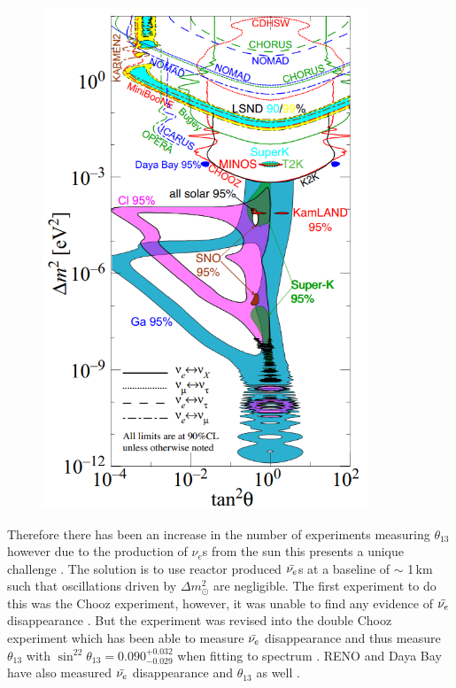 \begin{figure}[htbp]
 \centering
 \includegraphics[height=150mm]{Chapter1/Figs/Raster/neutrino_angles_experiments_variations.png} %
 \label{neutrino_angles_experiments_variations}
\end{figure}
Therefore there has been an increase in the number of experiments measuring $\theta_{13}$ however due to the production of $\nu_e$s from the sun this presents a unique challenge \cite{Olive_2014}. The solution is to use reactor produced $\Bar{\nu_e}$s at a baseline of $\sim$ 1\,km such that oscillations driven by $\Delta m_\odot^2$ are negligible. The first experiment to do this was the Chooz experiment, however, it was unable to find any evidence of $\Bar{\nu_e}$ disappearance \cite{Olive_2014}. But the experiment was revised into the double Chooz experiment which has been able to measure $\Bar{\nu_e}$ disappearance and thus measure $\theta_{13}$ with $\sin^22\theta_{13} = 0.090^{+0.032}_{-0.029}$ when fitting to spectrum \cite{abe2014improved}. RENO and Daya Bay have also measured $\Bar{\nu_e}$ disappearance and $\theta_{13}$ as well \cite{Olive_2014}.  

